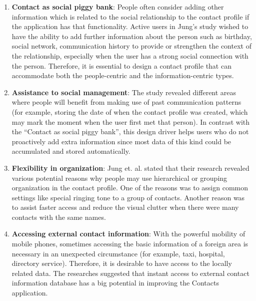\begin{enumerate}
  \item \textbf{Contact as social piggy bank}: People often consider adding other information which is related to the social relationship to the contact profile if the application has that functionality. Active users in Jung's study wished to have the ability to add further information about the person such as birthday, social network, communication history to provide or strengthen the context of the relationship, especially when the user has a strong social connection with the person. Therefore, it is essential to design a contact profile that can accommodate both the people-centric and the information-centric types.  
  \item \textbf{Assistance to social management}: The study revealed different areas where people will benefit from making use of past communication patterns (for example, storing the date of when the contact profile was created, which may mark the moment when the user first met that person). In contrast with the ``Contact as social piggy bank'', this design driver helps users who do not proactively add extra information since most data of this kind could be accumulated and stored automatically.
  \item \textbf{Flexibility in organization}: Jung et. al. stated that their research revealed various potential reasons why people may use hierarchical or grouping organization in the contact profile. One of the reasons was to assign common settings like special ringing tone to a group of contacts. Another reason was to assist faster access and reduce the visual clutter when there were many contacts with the same names.
  \item \textbf{Accessing external contact information}: With the powerful mobility of mobile phones, sometimes accessing the basic information of a foreign area is necessary in an unexpected circumstance (for example, taxi, hospital, directory service). Therefore, it is desirable to have access to the locally related data. The researches suggested that instant access to external contact information database has a big potential in improving the Contacts application.
\end{enumerate}

